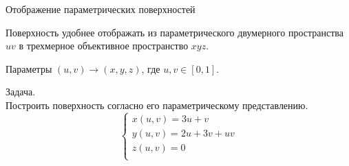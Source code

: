 \documentclass{beamer}
\begin{document}
	\begin{frame}{Отображение параметрических поверхностей}

		Поверхность удобнее отображать из параметрического двумерного пространства $uv$ в трехмерное объективное пространство $xyz$.

		Параметры $(u,v) \to (x,y,z)$, где $u,v \in [0,1]$.

		Задача. \\
		Построить поверхность согласно его параметрическому представлению.
		\[
		\begin{cases}
			x(u,v) = 3u +v \\
			y(u,v) = 2u +3v +uv \\
			z(u,v) = 0 \\
		\end{cases}	
		\]


	\end{frame}
\end{document}
